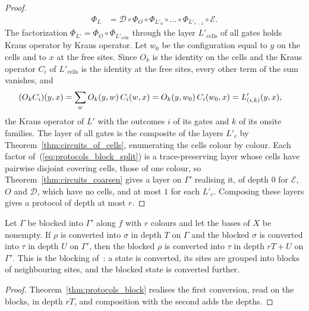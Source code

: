 \begin{proof}
\begin{align}
        \Phi_L&=\mathcal D\circ\Phi_O\circ\Phi_{L'_0}\circ\dots\circ\Phi_{L'_{r-1}}\circ\mathcal E.
        \label{eq:protocols_block_split}
    \end{align}
    The factorization $\Phi_{L'}=\Phi_O\circ\Phi_{L'_{\mathrm{cells}}}$ through the layer
    $L'_{\mathrm{cells}}$ of all gates holds Kraus operator by Kraus operator. Let $w_0$ be the
    configuration equal to $y$ on the cells and to $x$ at the free sites. Since $O_k$ is the
    identity on the cells and the Kraus operator $C_i$ of $L'_{\mathrm{cells}}$ is the identity
    at the free sites, every other term of the sum vanishes, and
    \begin{align}
        (O_kC_i)(y,x)&=\sum_wO_k(y,w)\,C_i(w,x)=O_k(y,w_0)\,C_i(w_0,x)=L'_{(i,k)}(y,x),
        \notag
    \end{align}
    the Kraus operator of $L'$ with the outcomes $i$ of its gates and $k$ of its onsite
    families. The layer of all gates is the
    composite of the layers $L'_c$ by Theorem~\ref{thm:circuits_of_cells}, enumerating the
    cells colour by colour. Each factor of~(\ref{eq:protocols_block_split}) is a
    trace-preserving layer whose cells have pairwise disjoint covering cells, those of one
    colour, so Theorem~\ref{thm:circuits_coarsen} gives a layer on $\Gamma'$ realising it,
    of depth $0$ for $\mathcal E$, $O$ and $\mathcal D$, which have no cells, and at most $1$
    for each $L'_c$. Composing these layers gives a protocol of depth at most $r$.
\end{proof}

\begin{theorem}
    \label{thm:protocols_block_trans}
    \leanok
    Let $\Gamma$ be blocked into $\Gamma'$ along $f$ with $r$ colours and let the bases of $X$
    be nonempty. If $\rho$ is converted into $\sigma$ in depth $T$ on $\Gamma$ and the
    blocked $\sigma$ is converted into $\tau$ in depth $U$ on $\Gamma'$, then the blocked
    $\rho$ is converted into $\tau$ in depth $rT+U$ on $\Gamma'$. This is the blocking
    of~\cite[main text]{Piroli2021LOCC}: a state is converted, its sites are grouped into
    blocks of neighbouring sites, and the blocked state is converted further.
\end{theorem}
\begin{proof}\leanok
    Theorem~\ref{thm:protocols_block} realises the first conversion, read on the blocks, in
    depth $rT$, and composition with the second adds the depths.
\end{proof}

